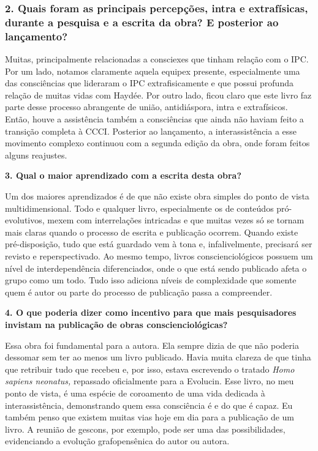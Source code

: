 \documentclass{gescons}
\begin{document}
\begin{multicols}{3}
\subsubsection{2. Quais foram as principais percepções, intra e extrafísicas, durante a pesquisa e a escrita da obra? E posterior ao lançamento?}


Muitas, principalmente relacionadas a consciexes que tinham relação com o IPC. Por um lado, notamos claramente aquela equipex presente, especialmente uma das consciências que lideraram o IPC extrafisicamente e que possui profunda relação de muitas vidas com Haydée. Por outro lado, ficou claro que este livro faz parte desse processo abrangente de união, antidiáspora, intra e extrafísicos. Então, houve a assistência também a consciências que ainda não haviam feito a transição completa à CCCI. Posterior ao lançamento, a interassistência a esse movimento complexo continuou com a segunda edição da obra, onde foram feitos alguns reajustes.


\textbf{3. Qual o maior aprendizado com a escrita desta obra?}

Um dos maiores aprendizados é de que não existe obra simples do ponto de vista multidimensional. Todo e qualquer livro, especialmente os de conteúdos pró-evolutivos, mexem com interrelações intricadas e que muitas vezes só se tornam mais claras quando o processo de escrita e publicação ocorrem. Quando existe pré-disposição, tudo que está guardado vem à tona e, infalivelmente, precisará ser revisto e reperspectivado. Ao mesmo tempo, livros conscienciológicos possuem um nível de interdependência diferenciados, onde o que está sendo publicado afeta o grupo como um todo. Tudo isso adiciona níveis de complexidade que somente quem é autor ou parte do processo de publicação passa a compreender.

\textbf{4. O que poderia dizer como incentivo para que mais pesquisadores invistam na publicação de obras conscienciológicas?}

Essa obra foi fundamental para a autora. Ela sempre dizia de que não poderia dessomar sem ter ao menos um livro publicado. Havia muita clareza de que tinha que retribuir tudo que recebeu e, por isso, estava escrevendo o tratado \emph{Homo sapiens neonatus,} repassado oficialmente para a Evolucin. Esse livro, no meu ponto de vista, é uma espécie de coroamento de uma vida dedicada à interassistência, demonstrando quem essa consciência é e do que é capaz. Eu também penso que existem muitas vias hoje em dia para a publicação de um livro. A reunião de gescons, por exemplo, pode ser uma das possibilidades, evidenciando a evolução grafopensênica do autor ou autora.\\




    
    \end{multicols}
\end{document}
